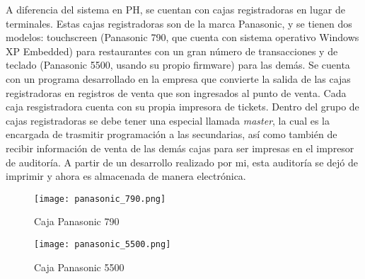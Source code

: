 A diferencia del sistema en PH, se cuentan con cajas registradoras en lugar de terminales. Estas cajas registradoras son de la marca Panasonic, y se tienen dos modelos: touchscreen (Panasonic 790, que cuenta con sistema operativo Windows XP Embedded) para restaurantes con un gran número de transacciones y de teclado (Panasonic 5500, usando su propio firmware) para las demás. Se cuenta con un programa desarrollado en la empresa que convierte la salida de las cajas registradoras en registros de venta que son ingresados al punto de venta. Cada caja resgistradora cuenta con su propia impresora de tickets. Dentro del grupo de cajas registradoras se debe tener una especial llamada \textit{master}, la cual es la encargada de trasmitir programación a las secundarias, así como también de recibir información de venta de las demás cajas para ser impresas en el impresor de auditoría. A partir de un desarrollo realizado por mi, esta auditoría se dejó de imprimir y ahora es almacenada de manera electrónica.

\begin{figure}[htb]
 \begin{center}
  \texttt{[image: panasonic\_790.png]}
 \end{center}
 \caption{Caja Panasonic 790}
 \label{fig:pana_790}
\end{figure}

\begin{figure}[htb]
 \begin{center}
  \texttt{[image: panasonic\_5500.png]}
 \end{center}
 \caption{Caja Panasonic 5500}
 \label{fig:pana_5500}
\end{figure}


